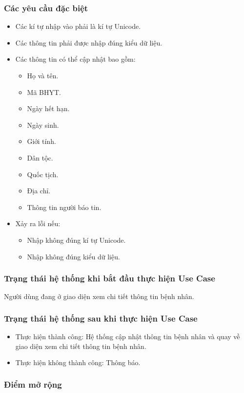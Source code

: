 \subsubsection{Các yêu cầu đặc biệt}
\begin{itemize}
  \item Các kí tự nhập vào phải là kí tự Unicode.
  \item Các thông tin phải được nhập đúng kiểu dữ liệu.
  \item Các thông tin có thể cập nhật bao gồm:
    \begin{itemize}
      \item Họ và tên.
      \item Mã BHYT.
      \item Ngày hết hạn.
      \item Ngày sinh.
      \item Giới tính.
      \item Dân tộc.
      \item Quốc tịch.
      \item Địa chỉ.
      \item Thông tin người báo tin.
    \end{itemize}
  \item Xảy ra lỗi nếu:
    \begin{itemize}
      \item Nhập không đúng kí tự Unicode.
      \item Nhập không đúng kiểu dữ liệu.
    \end{itemize}
\end{itemize}

\subsubsection{Trạng thái hệ thống khi bắt đầu thực hiện Use Case}
Người dùng đang ở giao diện xem chi tiết thông tin bệnh nhân.

\subsubsection{Trạng thái hệ thống sau khi thực hiện Use Case}
\begin{itemize}
  \item Thực hiện thành công: Hệ thống cập nhật thông tin bệnh nhân và quay về giao diện xem chi tiết thông tin bệnh nhân.
  \item Thực hiện không thành công: Thông báo.
\end{itemize}

\subsubsection{Điểm mở rộng}